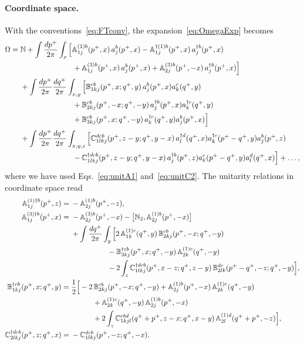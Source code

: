 \documentclass[aps,prd,onecolumn,superscriptaddress,nofootinbib,floatfix,longbibliography,11pt]{revtex4-2}
\numberwithin{equation}{section}
\def\mf#1{\mathbb{#1}}
\begin{document}
\paragraph*{Coordinate space.} With the conventions~\eqref{eq:FTconv}, the expansion~\eqref{eq:OmegaExp} becomes
\begin{align}
\Omega={}&\mf N+\int\frac{dp^+}{2\pi}\int_x\Big[\mf A^{(1)b}_{1j}(p^+,x)\,a^b_j(p^+,x)-\mf A^{\dagger(1)b}_{1j}(p^+,x)\,a^{\dagger b}_j(p^+,x)\notag\\
&\hspace{7em}+\mf A^{(3)b}_{1j}(p^+,x)\,a^b_j(p^+,x)+\mf A^{(3)b}_{2j}(p^+,-x)\,a^{\dagger b}_j(p^+,x)\Big]\notag\\
&+\int\frac{dp^+}{2\pi}\frac{dq^+}{2\pi}\int_{x,y}\Big[\mf B^{cb}_{1kj}(p^+,x;q^+,y)\,a^b_j(p^+,x)a^c_k(q^+,y)\notag\\
&\hspace{7em}+\mf B^{cb}_{2kj}(p^+,-x;q^+,-y)\,a^{\dagger b}_j(p^+,x)a^{\dagger c}_k(q^+,y)\notag\\
&\hspace{7em}+\mf B^{cb}_{3kj}(p^+,x;q^+,-y)\,a^{\dagger c}_k(q^+,y)a^b_j(p^+,x)\Big]\notag\\
&+\int\frac{dp^+}{2\pi}\frac{dq^+}{2\pi}\int_{x,y,z}\Big[\mf C^{dcb}_{1lkj}(p^+,z-y;q^+,y-x)\,a^{\dagger d}_l(q^+,x)a^{\dagger c}_k(p^+-q^+,y)a^b_j(p^+,z)\notag\\
&\hspace{7em}-\mf C^{\dagger dcb}_{1lkj}(p^+,z-y;q^+,y-x)\,a^{\dagger b}_j(p^+,z)a^c_k(p^+-q^+,y)a^d_l(q^+,x)\Big]+\dots,
\label{eq:OmegaX}
\end{align}
where we have used Eqs.~\eqref{eq:unitA1} and~\eqref{eq:unitC2}. The unitarity relations in coordinate space read
\begin{align}
\mf A^{(1)\dagger b}_{1j}(p^+,z)={}&-\mf A^{(1)b}_{2j}(p^+,-z),\label{eq:unitA1X}\\
\mf A^{(3)\dagger b}_{1j}(p^+,x)={}&-\mf A^{(3)b}_{2j}(p^+,-x)-\big[\mf N_2,\mf A^{(1)b}_{2j}(p^+,-x)\big]\notag\\
&+\int\frac{dq^+}{2\pi}\int_y\Big[2\,\mf A^{(1)c}_{1k}(q^+,y)\,\mf B^{cb}_{2kj}(p^+,-x;q^+,-y)\notag\\
&\hspace{5em}-\mf B^{\dagger cb}_{3kj}(p^+,x;q^+,-y)\,\mf A^{(1)c}_{2k}(q^+,-y)\notag\\
&\hspace{5em}-2\int_z\mf C^{\dagger dcb}_{1lkj}(p^+,x-z;q^+,z-y)\,\mf B^{dc}_{2lk}(p^+-q^+,-z;q^+,-y)\Big],\label{eq:unitA3X}\\
\mf B^{\dagger cb}_{1kj}(p^+,x;q^+,y)={}&\frac12\Big[-2\,\mf B^{cb}_{2kj}(p^+,-x;q^+,-y)+\mf A^{(1)b}_{2j}(p^+,-x)\,\mf A^{(1)c}_{2k}(q^+,-y)\notag\\
&\hspace{3em}+\mf A^{(1)c}_{2k}(q^+,-y)\,\mf A^{(1)b}_{2j}(p^+,-x)\notag\\
&\hspace{3em}+2\int_z\mf C^{cbd}_{1kjl}(q^++p^+,z-x;q^+,x-y)\,\mf A^{(1)d}_{2l}(q^++p^+,-z)\Big],\label{eq:unitB1X}\\
\mf C^{\dagger dcb}_{2lkj}(p^+,z;q^+,x)={}&-\mf C^{dcb}_{1lkj}(p^+,-z;q^+,-x).\label{eq:unitC2X}
\end{align}
\end{document}
